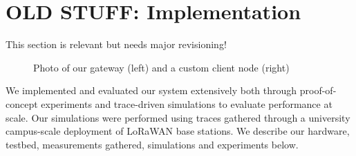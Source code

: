 \section{OLD STUFF: Implementation}
\label{sec:old-arch}

{\color{red} This section is relevant but needs major revisioning!}



\begin{figure}%
\centering
\compactimg
{}
\hfill
{}
\caption{Photo of our gateway (left) and a custom client node (right)}
\end{figure}



We implemented and evaluated our system extensively both through proof-of-concept experiments and trace-driven simulations to evaluate performance at scale. Our simulations were performed using traces gathered through a university campus-scale deployment of LoRaWAN base stations. We describe our hardware, testbed, measurements gathered, simulations and experiments below. 


